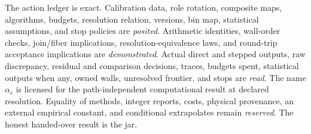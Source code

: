 The action ledger is exact.  Calibration data, role rotation, composite maps, algorithms, budgets, resolution relation,
versions, bin map, statistical assumptions, and stop policies are \emph{posited}.  Arithmetic identities, wall-order
checks, join/fiber implications, resolution-equivalence laws, and round-trip acceptance implications are
\emph{demonstrated}.  Actual direct and stepped outputs, raw discrepancy, residual and comparison decisions, traces,
budgets spent, statistical outputs when any, owned walls, unresolved frontier, and stops are \emph{read}.  The name
\(\alpha_c\) is licensed for the path-independent
computational result at declared resolution.  Equality of methods, integer reports, costs, physical provenance, an
external empirical constant, and conditional extrapolates remain \emph{reserved}.  The honest handed-over result is
the jar.
